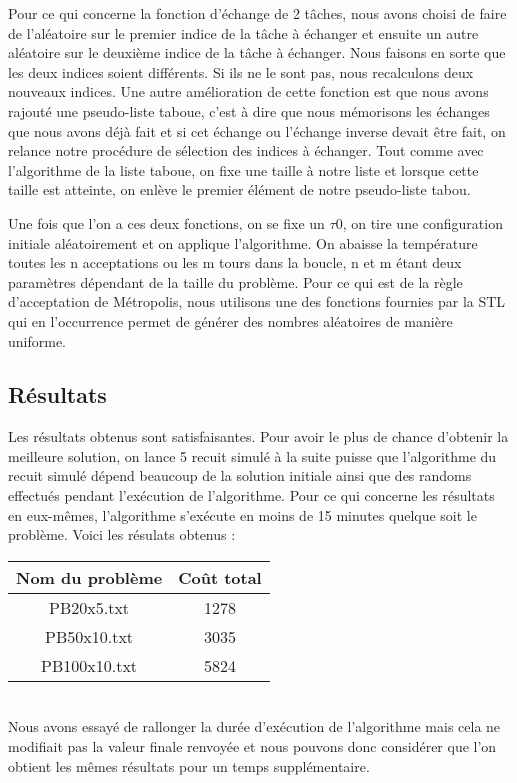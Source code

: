 \documentclass{report}
\begin{document}
Pour ce qui concerne la fonction d'échange de 2 tâches, nous avons choisi de faire de l'aléatoire sur le premier indice
de la tâche à échanger et ensuite un autre aléatoire sur le deuxième indice de la tâche à échanger. Nous faisons en
sorte que les deux indices soient différents. Si ils ne le sont pas, nous recalculons deux nouveaux indices. Une autre
amélioration de cette fonction est que nous avons rajouté une pseudo-liste taboue, c'est à dire que nous mémorisons les
échanges que nous avons déjà fait et si cet échange ou l'échange inverse devait être fait, on relance notre procédure de
sélection des indices à échanger. Tout comme avec l'algorithme de la liste taboue, on fixe une taille à notre liste et lorsque cette taille est atteinte, on enlève le premier élément de notre pseudo-liste tabou.

Une fois que l'on a ces deux fonctions, on se fixe un $\tau 0$, on tire une configuration initiale aléatoirement et on
applique l'algorithme. On abaisse la température toutes les n acceptations ou les m tours dans la boucle, n et m étant
deux paramètres dépendant de la taille du problème. Pour ce qui est de la règle d'acceptation de Métropolis, nous
utilisons une des fonctions fournies par la STL qui en l'occurrence permet de générer des nombres aléatoires de manière uniforme.

\subsection{Résultats}
Les résultats obtenus sont satisfaisantes. Pour avoir le plus de chance d'obtenir la meilleure solution, on lance 5 recuit simulé à la suite puisse que l'algorithme du recuit simulé dépend beaucoup de la solution initiale ainsi que des randoms effectués pendant l'exécution de l'algorithme. Pour ce qui concerne les résultats en eux-mêmes, l'algorithme s'exécute en moins de 15 minutes quelque soit le problème. Voici les résulats obtenus :


\begin{tabular}{|c|c|}
	\hline
	Nom du problème & Coût total\\
	\hline
	PB20x5.txt & 1278 \\
	PB50x10.txt & 3035 \\
	PB100x10.txt & 5824 \\
	\hline
\end{tabular}\\

Nous avons essayé de rallonger la durée d'exécution de l'algorithme mais cela ne modifiait pas la valeur finale renvoyée
et nous pouvons donc considérer que l'on obtient les mêmes résultats pour un temps supplémentaire.
\end{document}
